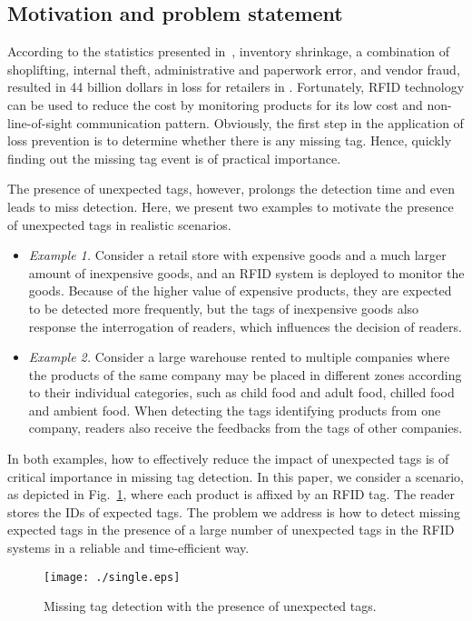 \documentclass[10pt, twocolumn]{IEEEtran}
\begin{document}
\subsection{Motivation and problem statement}
According to the statistics presented in~\cite{National2015}, inventory shrinkage, a combination of shoplifting, internal theft, administrative and paperwork error, and vendor fraud, resulted in 44 billion dollars in loss for retailers in .
Fortunately, RFID technology can be used to reduce the cost by monitoring products for its low cost and non-line-of-sight communication pattern.
Obviously, the first step in the application of loss prevention is to determine whether there is any missing tag. Hence, quickly finding out the missing tag event is of practical importance.

The presence of unexpected tags, however, prolongs the detection time and even leads to miss detection.
Here, we present two examples to motivate the presence of unexpected tags in realistic scenarios.
\begin{itemize}
\item \emph{Example 1.} Consider a retail store with expensive goods and a much larger amount of inexpensive goods, and an RFID system is deployed to monitor the goods. Because of the higher value of expensive products, they are expected to be detected more frequently, but the tags of inexpensive goods also response the interrogation of readers, which influences the decision of readers.
\item \emph{Example 2.} Consider a large warehouse rented to multiple companies where the products of the same company may be placed in different zones according to their individual categories, such as child food and adult food, chilled food and ambient food. When detecting the tags identifying products from one company, readers also receive the feedbacks from the tags of other companies.
\end{itemize}

In both examples, how to effectively reduce the impact of unexpected tags is of critical importance in missing tag detection. In this paper, we consider a scenario, as depicted in Fig.~\ref{Fig:single_reader}, where each product is affixed by an RFID tag. The reader stores the IDs of expected tags. The problem we address is how to detect missing expected tags in the presence of a large number of unexpected tags in the RFID systems in a reliable and time-efficient way.

\begin{figure}[htbp]
\vspace{-0cm}
\centering
\texttt{[image: ./single.eps]}
\vspace{-0cm}
\caption{Missing tag detection with the presence of unexpected tags.}
\label{Fig:single_reader}
\end{figure}
\end{document}
